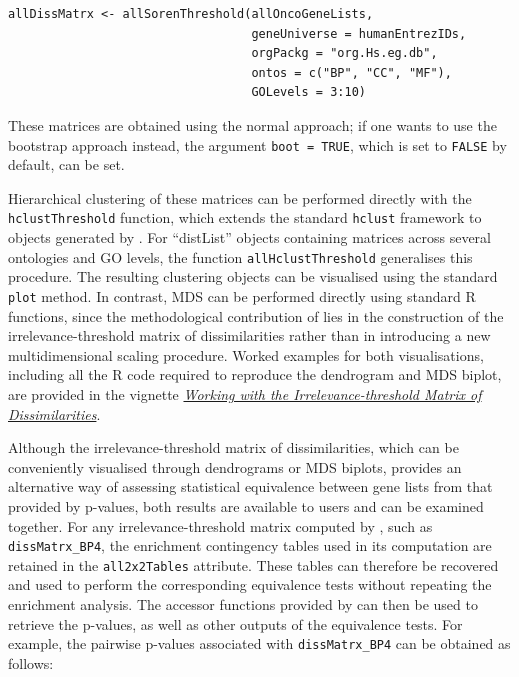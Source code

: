 \begin{verbatim}
allDissMatrx <- allSorenThreshold(allOncoGeneLists,
                                  geneUniverse = humanEntrezIDs, 
                                  orgPackg = "org.Hs.eg.db", 
                                  ontos = c("BP", "CC", "MF"), 
                                  GOLevels = 3:10)
\end{verbatim}

These matrices are obtained using the normal approach; if one wants to use the bootstrap approach instead, the argument \texttt{boot\ =\ TRUE}, which is set to \texttt{FALSE} by default, can be set.

Hierarchical clustering of these matrices can be performed directly with the \texttt{hclustThreshold} function, which extends the standard \texttt{hclust} framework to objects generated by . For ``distList'' objects containing matrices across several ontologies and GO levels, the function \texttt{allHclustThreshold} generalises this procedure. The resulting clustering objects can be visualised using the standard \texttt{plot} method. In contrast, MDS can be performed directly using standard R functions, since the methodological contribution of  lies in the construction of the irrelevance-threshold matrix of dissimilarities rather than in introducing a new multidimensional scaling procedure. Worked examples for both visualisations, including all the R code required to reproduce the dendrogram and MDS biplot, are provided in the vignette \href{https://www.bioconductor.org/packages/release/bioc/vignettes/goSorensen/inst/doc/Dissimilarities_Matrix.html}{\emph{Working with the Irrelevance-threshold Matrix of Dissimilarities}}.

Although the irrelevance-threshold matrix of dissimilarities, which can be conveniently visualised through dendrograms or MDS biplots, provides an alternative way of assessing statistical equivalence between gene lists from that provided by p-values, both results are available to users and can be examined together. For any irrelevance-threshold matrix computed by , such as \texttt{dissMatrx\_BP4}, the enrichment contingency tables used in its computation are retained in the \texttt{all2x2Tables} attribute. These tables can therefore be recovered and used to perform the corresponding equivalence tests without repeating the enrichment analysis. The accessor functions provided by  can then be used to retrieve the p-values, as well as other outputs of the equivalence tests. For example, the pairwise p-values associated with \texttt{dissMatrx\_BP4} can be obtained as follows:

